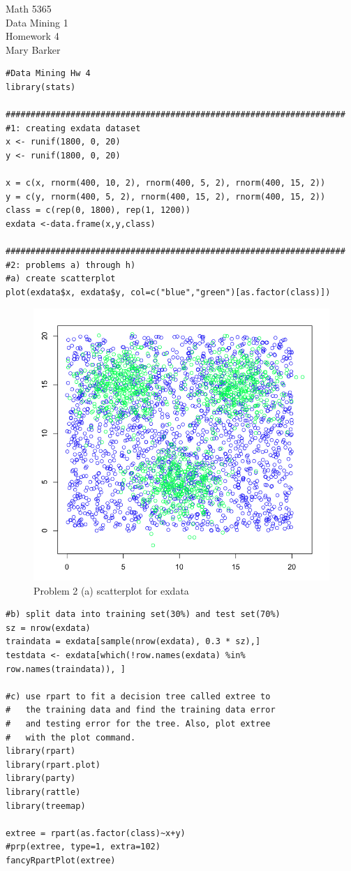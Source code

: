 \documentclass[11pt]{article}
\begin{document}
\noindent\large{Math 5365}\\
\large{Data Mining 1}\\
\large{Homework 4}\\
\large{Mary Barker}
\newline
\singlespace
\begin{Verbatim}
#Data Mining Hw 4
library(stats)

####################################################################
#1: creating exdata dataset
x <- runif(1800, 0, 20)
y <- runif(1800, 0, 20)

x = c(x, rnorm(400, 10, 2), rnorm(400, 5, 2), rnorm(400, 15, 2))
y = c(y, rnorm(400, 5, 2), rnorm(400, 15, 2), rnorm(400, 15, 2))
class = c(rep(0, 1800), rep(1, 1200))
exdata <-data.frame(x,y,class)

####################################################################
#2: problems a) through h)
#a) create scatterplot
plot(exdata$x, exdata$y, col=c("blue","green")[as.factor(class)])
\end{Verbatim}

\begin{figure}[H]
\begin{center}
\includegraphics[scale=0.35]{images/scatter}
\caption{Problem 2 (a) scatterplot for exdata}
\end{center}
\end{figure}

\begin{Verbatim}
#b) split data into training set(30%) and test set(70%)
sz = nrow(exdata)
traindata = exdata[sample(nrow(exdata), 0.3 * sz),]
testdata <- exdata[which(!row.names(exdata) %in% row.names(traindata)), ]

#c) use rpart to fit a decision tree called extree to 
#   the training data and find the training data error 
#   and testing error for the tree. Also, plot extree 
#   with the plot command.
library(rpart)
library(rpart.plot)
library(party)
library(rattle)
library(treemap)

extree = rpart(as.factor(class)~x+y)
#prp(extree, type=1, extra=102)
fancyRpartPlot(extree)
\end{Verbatim}
\end{document}
